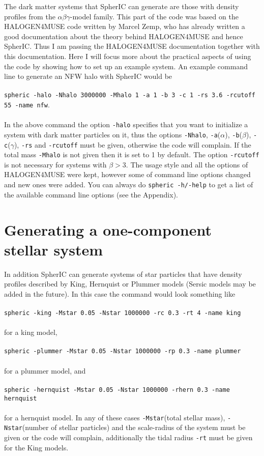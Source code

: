 \documentclass[letterpaper,10pt]{article}
\begin{document}
The dark matter systems that SpherIC can generate are those with density profiles from the $\alpha\beta\gamma$-model family. This part of the code was based on the HALOGEN4MUSE code written by Marcel Zemp\footnotemark[2] , who has already written a good documentation about the theory behind HALOGEN4MUSE and hence SpherIC. Thus I am passing the HALOGEN4MUSE documentation together with this documentation. Here I will focus more about the practical aspects of using the code by showing how to set up an example system. An example command line to generate an NFW halo with SpherIC would be\\
\\
\texttt{spheric -halo -Nhalo 3000000 -Mhalo 1 -a 1 -b 3 -c 1 -rs 3.6 -rcutoff 55 -name nfw}. \\ 
\\
In the above command the option \texttt{-halo} specifies that you want to initialize a system with dark matter particles on it, thus the options \texttt{-Nhalo}, \texttt{-a}($\alpha$), \texttt{-b}($\beta$), \texttt{-c}($\gamma$), \texttt{-rs} and \texttt{-rcutoff} must be given, otherwise the code will complain. If the total mass \texttt{-Mhalo} is not given then it is set to 1 by default. The option \texttt{-rcutoff} is not necessary for systems with  $\beta > 3$. The usage style and all the options of HALOGEN4MUSE were kept, however some of command line options changed and new ones were added. You can always do \texttt{spheric -h/-help} to get a list of the available command line options (see the Appendix).


\section{Generating a one-component stellar system}

In addition SpherIC can generate systems of star particles that have density profiles described by King, Hernquist or Plummer models (Sersic models may be added in the future). In this case the command would look something like\\
\\
\texttt{spheric -king -Mstar 0.05 -Nstar 1000000 -rc 0.3 -rt 4 -name king}\\
\\
for a king model,\\
\\
\texttt{spheric -plummer -Mstar 0.05 -Nstar 1000000 -rp 0.3 -name plummer}\\
\\
for a plummer model, and\\
\\
\texttt{spheric -hernquist -Mstar 0.05 -Nstar 1000000 -rhern 0.3 -name hernquist}\\
\\
for a hernquist model. In any of these cases \texttt{-Mstar}(total stellar mass), \texttt{-Nstar}(number of stellar particles) and the scale-radius of the system must be given or the code will complain, additionally the tidal radius \texttt{-rt} must be given for the King models.
\end{document}
